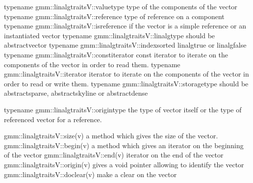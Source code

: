 \documentclass[a4paper,11pt,english]{sphinxmanual}
\begin{document}
\begin{sphinxVerbatim}[commandchars=\\\{\}]
typename gmm::linalg\PYGZus{}traits\PYGZlt{}V\PYGZgt{}::value\PYGZus{}type     \PYGZhy{}\PYGZhy{}\PYGZgt{} type of the components of the
                                                   vector
typename gmm::linalg\PYGZus{}traits\PYGZlt{}V\PYGZgt{}::reference      \PYGZhy{}\PYGZhy{}\PYGZgt{} type of reference on a component
typename gmm::linalg\PYGZus{}traits\PYGZlt{}V\PYGZgt{}::is\PYGZus{}reference   \PYGZhy{}\PYGZhy{}\PYGZgt{} if the vector is a simple
                                                   reference or an instantiated vector
typename gmm::linalg\PYGZus{}traits\PYGZlt{}V\PYGZgt{}::linalg\PYGZus{}type    \PYGZhy{}\PYGZhy{}\PYGZgt{} should be abstract\PYGZus{}vector
typename gmm::linalg\PYGZus{}traits\PYGZlt{}V\PYGZgt{}::index\PYGZus{}sorted    \PYGZhy{}\PYGZhy{}\PYGZgt{} linalg\PYGZus{}true or linalg\PYGZus{}false
typename gmm::linalg\PYGZus{}traits\PYGZlt{}V\PYGZgt{}::const\PYGZus{}iterator \PYGZhy{}\PYGZhy{}\PYGZgt{} const iterator to iterate on the
                                                   components of the vector in
                                                   order to read them.
typename gmm::linalg\PYGZus{}traits\PYGZlt{}V\PYGZgt{}::iterator       \PYGZhy{}\PYGZhy{}\PYGZgt{} iterator to iterate on the
                                                   components of the vector in
                                                   order to read or write them.
typename gmm::linalg\PYGZus{}traits\PYGZlt{}V\PYGZgt{}::storage\PYGZus{}type   \PYGZhy{}\PYGZhy{}\PYGZgt{} should be abstract\PYGZus{}sparse,
                                                   abstract\PYGZus{}skyline or
                                                   abstract\PYGZus{}dense

typename gmm::linalg\PYGZus{}traits\PYGZlt{}V\PYGZgt{}::origin\PYGZus{}type    \PYGZhy{}\PYGZhy{}\PYGZgt{} the type of vector itself
                                                   or the type of referenced
                                                   vector for a reference.

gmm::linalg\PYGZus{}traits\PYGZlt{}V\PYGZgt{}::size(v)     \PYGZhy{}\PYGZhy{}\PYGZgt{} a method which gives the size of the vector.
gmm::linalg\PYGZus{}traits\PYGZlt{}V\PYGZgt{}::begin(v)    \PYGZhy{}\PYGZhy{}\PYGZgt{} a method which gives an iterator on the
                                       beginning of the vector
gmm::linalg\PYGZus{}traits\PYGZlt{}V\PYGZgt{}::end(v)      \PYGZhy{}\PYGZhy{}\PYGZgt{} iterator on the end of the vector
gmm::linalg\PYGZus{}traits\PYGZlt{}V\PYGZgt{}::origin(v)   \PYGZhy{}\PYGZhy{}\PYGZgt{} gives a void pointer allowing to identify
                                       the vector
gmm::linalg\PYGZus{}traits\PYGZlt{}V\PYGZgt{}::do\PYGZus{}clear(v) \PYGZhy{}\PYGZhy{}\PYGZgt{} make a clear on the vector


\end{sphinxVerbatim}
\end{document}
